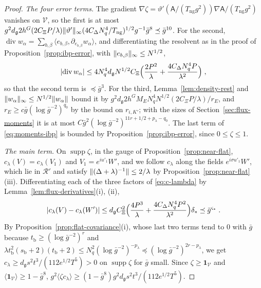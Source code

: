 \documentclass[11pt]{preprint}
\DeclarePairedDelimiter{\abs}{\lvert}{\rvert}
\DeclarePairedDelimiter{\norm}{\lVert}{\rVert}
\numberwithin{equation}{section}
\theoremstyle{definition}
\theoremstyle{remark}
\theoremstyle{plain}
\begin{document}
\begin{proof}
\emph{The four error terms.} The gradient $\nabla\zeta = \vartheta'(\mathsf A/(T_{\mathrm{ng}}g^2))\nabla\mathsf A/(T_{\mathrm{ng}}g^2)$ vanishes on $\mathcal V$, so the first is at most $g^2d_{\mathfrak g}2h^G(2C_\Xi P/\lambda)\norm{\vartheta'}_\infty(4C_\Delta N_q^4/T_{\mathrm{ng}})^{1/2}g^{-1}\bar g^8 \preceq \bar g^{10}$. For the second, $\operatorname{div}w_\alpha = \sum_{b,\beta}\langle e_{b,\beta}, \partial_{e_{b,\beta}}w_\alpha\rangle$, and differentiating the resolvent as in the proof of Proposition~\ref{prop:ibp-error}, with $\norm{e_{b,\beta}}_\infty \leq N^{1/2}$,
\begin{equation}\label{eq:divergence-bound}
    \abs{\operatorname{div}w_\alpha} \leq 4N_q^4d_{\mathfrak g}N^{1/2}C_\Xi\Bigl(\frac{2P^2}{\lambda} + \frac{4C_\Delta N_q^4P}{\lambda^2}\Bigr)\;,
\end{equation}
so that the second term is $\preceq \bar g^3$. For the third, Lemma~\ref{lem:density-rest} and $\norm{w_\alpha}_\infty \leq N^{1/2}\norm{w_\alpha}$ bound it by $g^2d_{\mathfrak g}2h^GM_EN_q^4N^{1/2}(2C_\Xi P/\lambda)/r_E$, and $r_E \geq c\bar g(\log\bar g^{-2})^{q_0}$ by the bound on $r_{i,K'}$; with the sizes of Section~\ref{sec:flux-moments} it is at most $C\bar g^2(\log\bar g^{-2})^{11r+1/2+p_\lambda-q_0}$. The last term of \eqref{eq:moments-ibp} is bounded by Proposition~\ref{prop:ibp-error}, since $0 \leq \zeta \leq 1$.

\emph{The main term.} On $\operatorname{supp}\zeta$, in the gauge of Proposition~\ref{prop:near-flat}, $c_\lambda(V) = c_\lambda(V_1)$ and $V_1 = e^{iu'_1}W'$, and we follow $c_\lambda$ along the fields $e^{i\sigma u'_1}W'$, which lie in $\mathcal R'$ and satisfy $\norm{(\Delta + \lambda)^{-1}} \leq 2/\lambda$ by Proposition~\ref{prop:near-flat}(iii). Differentiating each of the three factors of \eqref{eq:c-lambda} by Lemma~\ref{lem:flux-derivatives}(i), (ii),
\begin{equation}\label{eq:c-lambda-variation}
    \abs{c_\lambda(V) - c_\lambda(W')} \leq d_{\mathfrak g}C_\Xi^2\Bigl(\frac{4P^3}{\lambda} + \frac{4C_\Delta N_q^4P^2}{\lambda^2}\Bigr)\delta_* \preceq \bar g^{\varsigma_*}\;.
\end{equation}
By Proposition~\ref{prop:flat-covariance}(i), whose last two terms tend to $0$ with $\bar g$ because $t_{\mathrm b} \geq (\log\bar g^{-2})^r$ and $\lambda t_{\mathrm b}^2(s_{\mathrm b} + 2)(t_{\mathrm b} + 2) \leq N_q^2(\log\bar g^{-2})^{-p_\lambda} \preceq (\log\bar g^{-2})^{2r-p_\lambda}$, we get $c_\lambda \geq d_{\mathfrak g}s^2t^3/(112e^{1/2}T^5) > 0$ on $\operatorname{supp}\zeta$ for $\bar g$ small. Since $\zeta \geq \mathbf 1_{\mathcal V}$ and $\langle\mathbf 1_{\mathcal V}\rangle \geq 1 - \bar g^8$, $g^2\langle\zeta c_\lambda\rangle \geq (1 - \bar g^8)g^2d_{\mathfrak g}s^2t^3/(112e^{1/2}T^5)$.


\end{proof}
\end{document}
